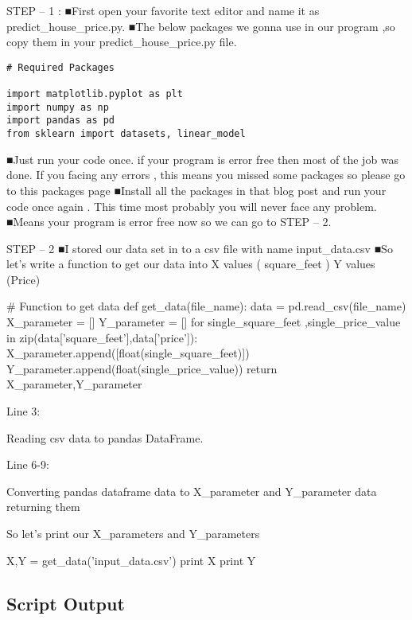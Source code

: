 STEP – 1 :
 ■First open your favorite text editor and name it as predict_house_price.py.
 ■The below packages we gonna use in our program ,so  copy them in your predict_house_price.py file.
 

\begin{framed}
\begin{verbatim}
# Required Packages

import matplotlib.pyplot as plt
import numpy as np
import pandas as pd
from sklearn import datasets, linear_model
\end{verbatim}
\end{framed}

 ■Just run your code once. if your program is error free then most of the job was done. If you facing  any errors , this means you missed some  packages so please go to this packages page  
 ■Install all the packages in that blog post and run your code once again . This time most probably you will never face any problem.
 ■Means your program is error free now so we can go to STEP – 2.

STEP – 2
 ■I stored our data set in to a csv file with name input_data.csv
 ■So let’s write a function to get our data into X values ( square_feet  ) Y values (Price)
 
# Function to get data
def get_data(file_name):
 data = pd.read_csv(file_name)
 X_parameter = []
 Y_parameter = []
 for single_square_feet ,single_price_value in zip(data['square_feet'],data['price']):
       X_parameter.append([float(single_square_feet)])
       Y_parameter.append(float(single_price_value))
 return X_parameter,Y_parameter
 
Line 3:
 
Reading csv data to pandas DataFrame.
 
Line 6-9:
 
Converting pandas dataframe data to X_parameter and Y_parameter data returning them
 
So let’s print our X_parameters and Y_parameters
 
X,Y = get_data('input_data.csv')
print X
print Y

\subsection*{Script Output}


